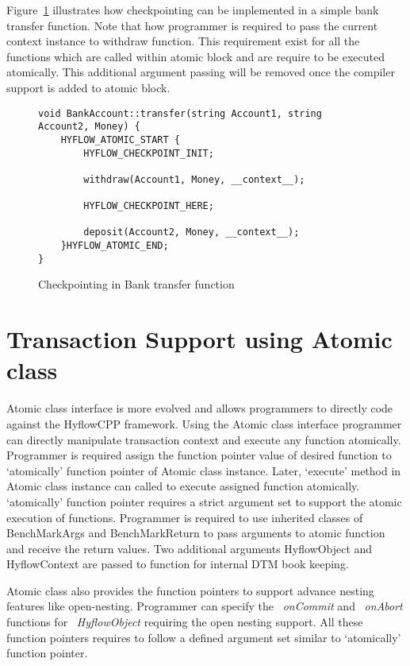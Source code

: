 \documentclass[12pt,english]{report}
\begin{document}
Figure~\ref{Fig:bankCP} illustrates how checkpointing can be implemented in a simple bank transfer function. Note that how programmer is required to pass the current context instance to withdraw function. This requirement exist for all the functions which are called within atomic block and are require to be executed atomically. This additional argument passing will be removed once the compiler support is added to atomic block. 

\begin{figure}
\begin{minipage}[b]{0.9\linewidth}\centering
\begin{lstlisting}
void BankAccount::transfer(string Account1, string Account2, Money) {
	HYFLOW_ATOMIC_START {
		HYFLOW_CHECKPOINT_INIT;

		withdraw(Account1, Money, __context__);

		HYFLOW_CHECKPOINT_HERE;
	
		deposit(Account2, Money, __context__);
	}HYFLOW_ATOMIC_END;
}
\end{lstlisting}
\end{minipage}
\caption{Checkpointing in Bank transfer function}
\label{Fig:bankCP}
\end{figure}

\section{Transaction Support using Atomic class}

Atomic class interface is more evolved and allows programmers to directly code against the HyflowCPP framework. Using the Atomic class interface programmer can directly manipulate transaction context and execute any function atomically. Programmer is required assign the function pointer value of desired function to `atomically' function pointer of Atomic class instance. Later, `execute' method in Atomic class instance can called to execute assigned function atomically. `atomically' function pointer requires a strict argument set to support the atomic execution of functions. Programmer is required to use inherited classes of BenchMarkArgs and BenchMarkReturn to pass arguments to atomic function and receive the return values. Two additional arguments HyflowObject and HyflowContext are passed to function for internal DTM book keeping.

Atomic class also provides the function pointers to support advance nesting features like open-nesting. Programmer can specify the ~\emph{onCommit} and ~\emph{onAbort} functions for  ~\emph{HyflowObject} requiring the open nesting support. All these function pointers requires to follow a defined argument set similar to `atomically' function pointer. 
\end{document}
